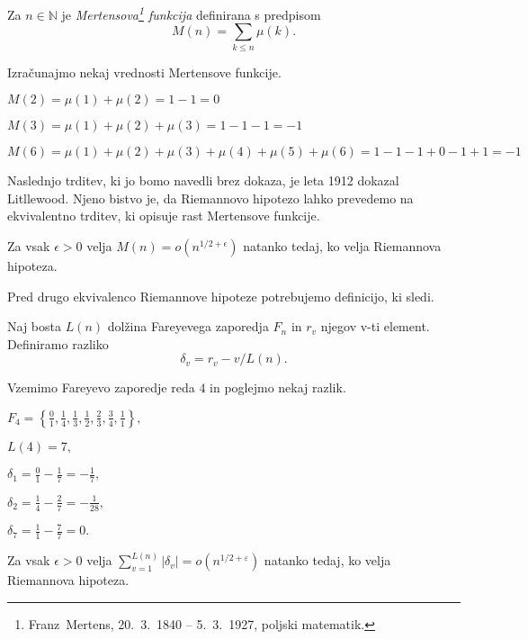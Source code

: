 \documentclass[mat1]{fmfdelo}
\begin{document}
\begin{definicija}
Za $n\in\mathbb{N}$ je \emph{Mertensova\footnote{Franz~Mertens, 20.~3.~1840 -- 5.~3.~1927, poljski matematik.} funkcija} definirana s predpisom
\[ M(n)=\sum_{k\leq n}\mu(k).\]
\end{definicija}

\begin{primer}
Izračunajmo nekaj vrednosti Mertensove funkcije.

\( M(2) = \mu(1) + \mu(2) = 1 - 1 = 0 \)

\( M(3) = \mu(1) + \mu(2) + \mu(3) = 1 - 1 - 1 = -1 \)

\( M(6) = \mu(1) + \mu(2) + \mu(3) + \mu(4) + \mu(5) + \mu(6) = 1 - 1 - 1 + 0 - 1 + 1 = -1 \)
\end{primer}

Naslednjo trditev, ki jo bomo navedli brez dokaza, je leta 1912 dokazal Litllewood. Njeno bistvo je, da Riemannovo hipotezo lahko prevedemo na ekvivalentno trditev, ki opisuje rast Mertensove funkcije. 

\begin{trditev}
Za vsak $\epsilon>0$ velja \( M(n) = o(n^{1/2+\epsilon}) \) natanko tedaj, ko velja Riemannova hipoteza.
\end{trditev}

Pred drugo ekvivalenco Riemannove hipoteze potrebujemo definicijo, ki sledi.

\begin{definicija}
Naj bosta $L(n)$ dolžina Fareyevega zaporedja $F_{n}$ in $r_{v}$ njegov v-ti element. Definiramo razliko
\[ \delta_{v}= r_{v}-v/L(n). \]
\end{definicija}

\begin{primer}
Vzemimo Fareyevo zaporedje reda $4$ in poglejmo nekaj razlik. 

\(F_4 = \left \{\frac{0}{1}, \frac{1}{4}, \frac{1}{3}, \frac{1}{2}, \frac{2}{3}, \frac{3}{4}, \frac{1}{1} \right \}, \)

\( L(4) = 7, \)

\( \delta_{1}= \frac{0}{1} - \frac{1}{7} = -\frac{1}{7}, \)

\( \delta_{2}= \frac{1}{4} - \frac{2}{7} = -\frac{1}{28}, \)

\( \delta_{7}= \frac{1}{1} - \frac{7}{7} = 0. \)
\end{primer}

\begin{trditev}
Za vsak $\epsilon>0$ velja \( \sum_{v=1}^{L(n)}|\delta_{v}| = o(n^{1/2+\varepsilon}) \) natanko tedaj, ko velja Riemannova hipoteza.
\end{trditev}
\end{document}
